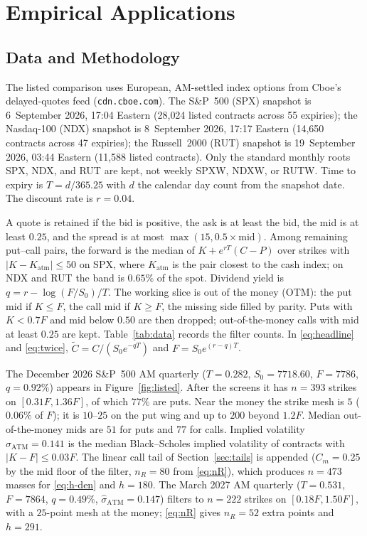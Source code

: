 \documentclass[preprint,12pt,authoryear,times]{elsarticle}
\begin{document}
\section{Empirical Applications}
\label{sec:emp}

\subsection{Data and Methodology}
\label{sec:data}

The listed comparison uses European, AM-settled index options from Cboe's delayed-quotes feed (\texttt{cdn.cboe.com}). The S\&P~500 (SPX) snapshot is 6~September 2026, 17:04 Eastern (28{,}024 listed contracts across 55 expiries); the Nasdaq-100 (NDX) snapshot is 8~September 2026, 17:17 Eastern (14{,}650 contracts across 47 expiries); the Russell~2000 (RUT) snapshot is 19~September 2026, 03:44 Eastern (11{,}588 listed contracts). Only the standard monthly roots SPX, NDX, and RUT are kept, not weekly SPXW, NDXW, or RUTW. Time to expiry is \(T=d/365.25\) with \(d\) the calendar day count from the snapshot date. The discount rate is \(r=0.04\).

A quote is retained if the bid is positive, the ask is at least the bid, the mid is at least \(0.25\), and the spread is at most \(\max(15,0.5\times\mathrm{mid})\). Among remaining put--call pairs, the forward is the median of \(K+e^{rT}(C-P)\) over strikes with \(|K-K_{\mathrm{atm}}|\le 50\) on SPX, where \(K_{\mathrm{atm}}\) is the pair closest to the cash index; on NDX and RUT the band is \(0.65\%\) of the spot. Dividend yield is \(q=r-\log(F/S_0)/T\). The working slice is out of the money (OTM): the put mid if \(K\le F\), the call mid if \(K\ge F\), the missing side filled by parity. Puts with \(K<0.7F\) and mid below \(0.50\) are then dropped; out-of-the-money calls with mid at least \(0.25\) are kept. Table~\ref{tab:data} records the filter counts. In \eqref{eq:headline} and \eqref{eq:twice}, \(\tilde C=C/(S_0e^{-qT})\) and \(F=S_0e^{(r-q)T}\).

The December 2026 S\&P~500 AM quarterly (\(T=0.282\), \(S_0=7718.60\), \(F=7786\), \(q=0.92\%\)) appears in Figure~\ref{fig:listed}. After the screens it has \(n=393\) strikes on \([0.31F,1.36F]\), of which \(77\%\) are puts. Near the money the strike mesh is \(5\) (\(0.06\%\) of \(F\)); it is \(10\)--\(25\) on the put wing and up to \(200\) beyond \(1.2F\). Median out-of-the-money mids are \(51\) for puts and \(77\) for calls. Implied volatility \(\hat\sigma_{\mathrm{ATM}}=0.141\) is the median Black--Scholes implied volatility of contracts with \(|K-F|\le 0.03F\). The linear call tail of Section~\ref{sec:tails} is appended (\(C_m=0.25\) by the mid floor of the filter, \(n_R=80\) from \eqref{eq:nR}), which produces \(n=473\) masses for \eqref{eq:h-den} and \(h=180\). The March 2027 AM quarterly (\(T=0.531\), \(F=7864\), \(q=0.49\%\), \(\hat\sigma_{\mathrm{ATM}}=0.147\)) filters to \(n=222\) strikes on \([0.18F,1.50F]\), with a \(25\)-point mesh at the money; \eqref{eq:nR} gives \(n_R=52\) extra points and \(h=291\).
\end{document}
